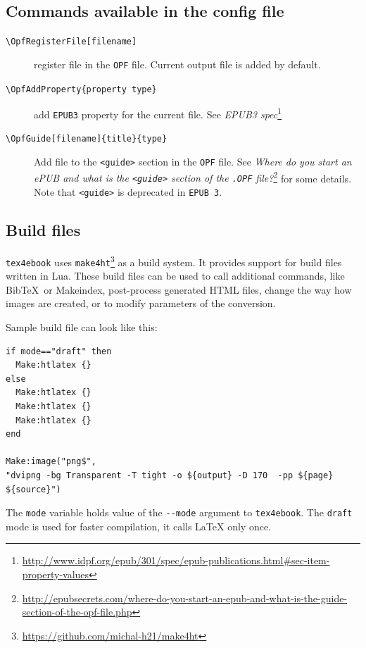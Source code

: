 \subsection{Commands available in the config
file}\label{commands-available-in-the-config-file}

\begin{description}
\item[\texttt{\textbackslash{}OpfRegisterFile{[}filename{]}}]
register file in the \texttt{OPF} file. Current output file is added by
default.
\item[\texttt{\textbackslash{}OpfAddProperty\{property\ type\}}]
add \texttt{EPUB3} property for the current file. See \emph{EPUB3
spec}\footnote{\url{http://www.idpf.org/epub/301/spec/epub-publications.html\#sec-item-property-values}}
\item[\texttt{\textbackslash{}OpfGuide{[}filename{]}\{title\}\{type\}}]
Add file to the \texttt{\textless{}guide\textgreater{}} section in the
\texttt{OPF} file. See \emph{Where do you start an ePUB and what is the
\texttt{\textless{}guide\textgreater{}} section of the \texttt{.OPF}
file?}\footnote{\url{http://epubsecrets.com/where-do-you-start-an-epub-and-what-is-the-guide-section-of-the-opf-file.php}}
for some details. Note that \texttt{\textless{}guide\textgreater{}} is
deprecated in \texttt{EPUB\ 3}.
\end{description}

\subsection{Build files}\label{build-files}

\texttt{tex4ebook} uses \texttt{make4ht}\footnote{\url{https://github.com/michal-h21/make4ht}}
as a build system. It provides support for build files written in Lua.
These build files can be used to call additional commands, like
Bib\TeX~or Makeindex, post-process generated HTML files, change the way
how images are created, or to modify parameters of the conversion.

Sample build file can look like this:

\begin{verbatim}
if mode=="draft" then
  Make:htlatex {}
else
  Make:htlatex {}
  Make:htlatex {}
  Make:htlatex {}
end

Make:image("png$",
"dvipng -bg Transparent -T tight -o ${output} -D 170  -pp ${page} ${source}")
\end{verbatim}

The \texttt{mode} variable holds value of the \texttt{-\/-mode} argument
to \texttt{tex4ebook}. The \texttt{draft} mode is used for faster
compilation, it calls LaTeX only once.


